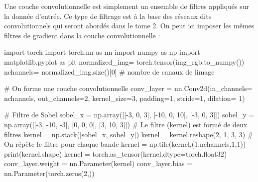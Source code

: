 \documentclass[
  french,
  11pt,
  letterpaper,
  open=any,
  twoside=false,
  french]{scrbook}
\newenvironment{Shaded}{\begin{snugshade}}{\end{snugshade}}
\newcommand{\BuiltInTok}[1]{\textcolor[rgb]{0.00,0.23,0.31}{#1}}
\newcommand{\CommentTok}[1]{\textcolor[rgb]{0.37,0.37,0.37}{#1}}
\newcommand{\DecValTok}[1]{\textcolor[rgb]{0.68,0.00,0.00}{#1}}
\newcommand{\ImportTok}[1]{\textcolor[rgb]{0.00,0.46,0.62}{#1}}
\newcommand{\NormalTok}[1]{\textcolor[rgb]{0.00,0.23,0.31}{#1}}
\newcommand{\OperatorTok}[1]{\textcolor[rgb]{0.37,0.37,0.37}{#1}}
\begin{document}
Une couche convolutionnelle est simplement un ensemble de filtres
appliqués sur la donnée d'entrée. Ce type de filtrage est à la base des
réseaux dits convolutionnels qui seront abordés dans le tome 2. On peut
ici imposer les mêmes filtres de gradient dans la couche
convolutionnelle :

\begin{Shaded}
\begin{Highlighting}[]
\ImportTok{import}\NormalTok{ torch}
\ImportTok{import}\NormalTok{ torch.nn }\ImportTok{as}\NormalTok{ nn}
\ImportTok{import}\NormalTok{ numpy }\ImportTok{as}\NormalTok{ np}
\ImportTok{import}\NormalTok{ matplotlib.pyplot }\ImportTok{as}\NormalTok{ plt}
\NormalTok{normalized\_img}\OperatorTok{=}\NormalTok{ torch.tensor(img\_rgb.to\_numpy())}
\NormalTok{nchannels}\OperatorTok{=}\NormalTok{ normalized\_img.size()[}\DecValTok{0}\NormalTok{] }\CommentTok{\# nombre de canaux de l\textquotesingle{}image}

\CommentTok{\# On forme une couche convolutionnelle}
\NormalTok{conv\_layer }\OperatorTok{=}\NormalTok{ nn.Conv2d(in\_channels}\OperatorTok{=}\NormalTok{ nchannels, out\_channels}\OperatorTok{=}\DecValTok{2}\NormalTok{, kernel\_size}\OperatorTok{=}\DecValTok{3}\NormalTok{, padding}\OperatorTok{=}\DecValTok{1}\NormalTok{, stride}\OperatorTok{=}\DecValTok{1}\NormalTok{, dilation}\OperatorTok{=} \DecValTok{1}\NormalTok{)}

\CommentTok{\# Filtre de Sobel}
\NormalTok{sobel\_x }\OperatorTok{=}\NormalTok{ np.array([[}\OperatorTok{{-}}\DecValTok{3}\NormalTok{, }\DecValTok{0}\NormalTok{, }\DecValTok{3}\NormalTok{], [}\OperatorTok{{-}}\DecValTok{10}\NormalTok{, }\DecValTok{0}\NormalTok{, }\DecValTok{10}\NormalTok{], [}\OperatorTok{{-}}\DecValTok{3}\NormalTok{, }\DecValTok{0}\NormalTok{, }\DecValTok{3}\NormalTok{]])}
\NormalTok{sobel\_y }\OperatorTok{=}\NormalTok{ np.array([[}\OperatorTok{{-}}\DecValTok{3}\NormalTok{, }\OperatorTok{{-}}\DecValTok{10}\NormalTok{, }\OperatorTok{{-}}\DecValTok{3}\NormalTok{], [}\DecValTok{0}\NormalTok{, }\DecValTok{0}\NormalTok{, }\DecValTok{0}\NormalTok{], [}\DecValTok{3}\NormalTok{, }\DecValTok{10}\NormalTok{, }\DecValTok{3}\NormalTok{]])}
\CommentTok{\# Le filtre (kernel) est formé de deux filtres}
\NormalTok{kernel }\OperatorTok{=}\NormalTok{ np.stack([sobel\_x, sobel\_y])}
\NormalTok{kernel }\OperatorTok{=}\NormalTok{ kernel.reshape(}\DecValTok{2}\NormalTok{, }\DecValTok{1}\NormalTok{, }\DecValTok{3}\NormalTok{, }\DecValTok{3}\NormalTok{)}
\CommentTok{\# On répète le filtre pour chaque bande}
\NormalTok{kernel }\OperatorTok{=}\NormalTok{ np.tile(kernel,(}\DecValTok{1}\NormalTok{,nchannels,}\DecValTok{1}\NormalTok{,}\DecValTok{1}\NormalTok{))}
\BuiltInTok{print}\NormalTok{(kernel.shape)}
\NormalTok{kernel }\OperatorTok{=}\NormalTok{ torch.as\_tensor(kernel,dtype}\OperatorTok{=}\NormalTok{torch.float32)}
\NormalTok{conv\_layer.weight }\OperatorTok{=}\NormalTok{ nn.Parameter(kernel)}
\NormalTok{conv\_layer.bias }\OperatorTok{=}\NormalTok{ nn.Parameter(torch.zeros(}\DecValTok{2}\NormalTok{,))}


\end{Highlighting}
\end{Shaded}
\end{document}
